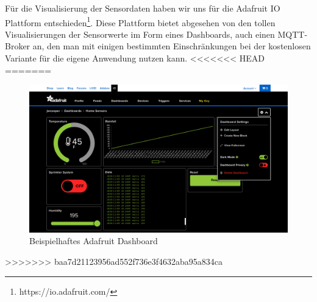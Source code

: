 Für die Visualisierung der Sensordaten haben wir uns für die Adafruit IO Plattform entschieden\footnote{https://io.adafruit.com/}. Diese Plattform bietet abgesehen von den tollen Visualisierungen der Sensorwerte im Form eines Dashboards, auch einen MQTT-Broker an, den man mit einigen bestimmten Einschränkungen bei der kostenlosen Variante für die eigene Anwendung nutzen kann. 
<<<<<<< HEAD
=======

\begin{figure}[h]
	 \centering
	 \includegraphics[width=1\textwidth]{pictures/adafruitdashboard}
	 \caption[Beispielhaftes Adafruit Dashboard]{Beispielhaftes Adafruit Dashboard\cite{adafruitdash}}
	 \label{fig:adafruitdashboard}
\end{figure}
>>>>>>> baa7d21123956ad552f736e3f4632aba95a834ca
